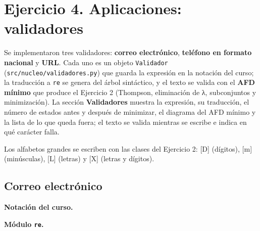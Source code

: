 \hypertarget{ejercicio-4.-aplicaciones-validadores}{%
\section{Ejercicio 4. Aplicaciones: validadores}\label{ejercicio-4.-aplicaciones-validadores}}

Se implementaron tres validadores: \textbf{correo electrónico}, \textbf{teléfono en formato nacional} y \textbf{URL}. Cada uno es un objeto \texttt{Validador} (\texttt{src/nucleo/validadores.py}) que guarda la expresión en la notación del curso; la traducción a \texttt{re} se genera del árbol sintáctico, y el texto se valida con el \textbf{AFD mínimo} que produce el Ejercicio 2 (Thompson, eliminación de λ, subconjuntos y minimización). La sección \textbf{Validadores} muestra la expresión, su traducción, el número de estados antes y después de minimizar, el diagrama del AFD mínimo y la lista de lo que queda fuera; el texto se valida mientras se escribe e indica en qué carácter falla.

Los alfabetos grandes se escriben con las clases del Ejercicio 2: {[}D{]} (dígitos), {[}m{]} (minúsculas), {[}L{]} (letras) y {[}X{]} (letras y dígitos).

\hypertarget{correo-electruxf3nico}{%
\subsection{Correo electrónico}\label{correo-electruxf3nico}}

\textbf{Notación del curso.}

\begin{Shaded}
\begin{Highlighting}[]
\end{Highlighting}
\end{Shaded}

\textbf{Módulo \texttt{re}.}

\begin{Shaded}
\begin{Highlighting}[]
\end{Highlighting}
\end{Shaded}

